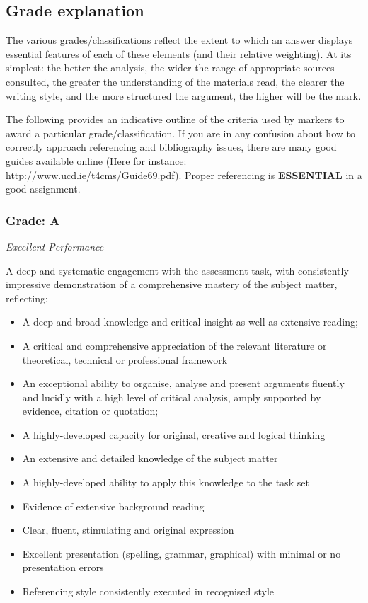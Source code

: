 
\subsection*{Grade explanation}

The various grades/classifications reflect the extent to which an answer displays essential features of each of these elements (and their relative weighting). At its simplest: the better the analysis, the wider the range of appropriate sources consulted, the greater the understanding of the materials read, the clearer the writing style, and the more structured the argument, the higher will be the mark. 

The following provides an indicative outline of the criteria used by markers to award a particular grade/classification. If you are in any confusion about how to correctly approach referencing and bibliography issues, there are many good guides available online (Here for instance: \url{http://www.ucd.ie/t4cms/Guide69.pdf}). Proper referencing is \textbf{ESSENTIAL} in a good assignment.

\subsubsection*{Grade: A}

\textit{Excellent Performance}

A deep and systematic engagement with the assessment task, with consistently impressive demonstration of a comprehensive mastery of the subject matter, reflecting:

\begin{itemize}
	\item A deep and broad knowledge and critical insight as well as extensive reading;
	\item A critical and comprehensive appreciation
	of the relevant literature or theoretical, technical or professional framework
	\item An exceptional ability to organise, analyse and present arguments fluently and lucidly with a high level of critical analysis, amply supported by evidence, citation or quotation;
	\item A highly-developed capacity for original,
	creative and logical thinking
	\item An extensive and detailed knowledge of the subject matter
	\item A highly-developed ability to apply this knowledge to the task set
	\item Evidence of extensive background reading
	\item Clear, fluent, stimulating and original expression
	\item Excellent presentation (spelling, grammar, graphical) with minimal or no presentation errors
	\item Referencing style consistently executed in recognised style
\end{itemize}



